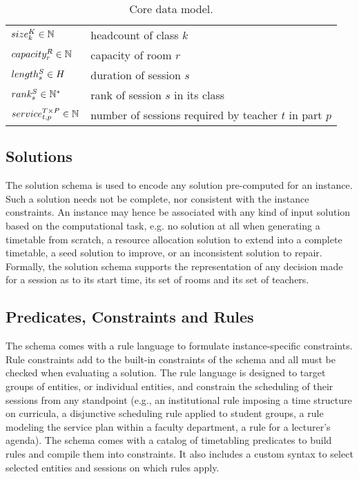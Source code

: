 \documentclass[runningheads]{llncs}
\begin{document}
\begin{table}[!t]
\begin{center}
\begin{tabular}{|l|l|}
\\
$size^{K}_{k}\in{\mathbb{N}}$            &  headcount of class $k$
\\
$capacity^{R}_{r}\in{\mathbb{N}}$             &  capacity of room $r$
\\
$length^{S}_{s}\in{H}$             &  duration of session $s$
\\
$rank^{S}_{s}\in{\mathbb{N}^*}$            &  rank of session $s$ in its class
\\
$service^{{T}\times{P}}_{t,p}\in{\mathbb{N}}$     &  number of sessions required by teacher $t$ in part $p$
\\\hline
\end{tabular}
\caption{Core data model.}
\label{table:entity-model}
\end{center}
\end{table}
%
   \subsection{Solutions}
\label{sec:solution}

The solution schema is used to encode
any solution pre-computed for an instance.
Such a solution needs not be complete, nor consistent with the instance constraints.
An instance may hence be associated with any kind of input solution based on the
computational task,
e.g. no solution at all when generating a timetable from scratch, 
a resource allocation solution to extend into a complete timetable,
a seed solution to improve, 
or an inconsistent solution to repair.
Formally, the solution schema
supports the representation of
any decision made for a session
as to its start time,
its set of rooms
and its set of teachers.





 \subsection{Predicates, Constraints and Rules}
\label{sec:schema-predicates-constraints-rules}

The \UTP{} schema comes with a rule language to formulate instance-specific constraints.
Rule constraints add to the built-in constraints of the schema
and all must be checked when evaluating a solution.
The rule language is designed to target groups of entities, or individual entities,
and constrain the scheduling of their sessions
from any standpoint
(e.g., an institutional rule imposing a time structure on curricula,
a disjunctive scheduling rule applied to student groups,
a rule modeling the service plan within a faculty department,
a rule for a lecturer's agenda).
The schema comes with a catalog of timetabling predicates
to build rules and compile them into constraints.
It also includes a custom syntax to select
selected entities and sessions on which rules apply.
\end{document}
